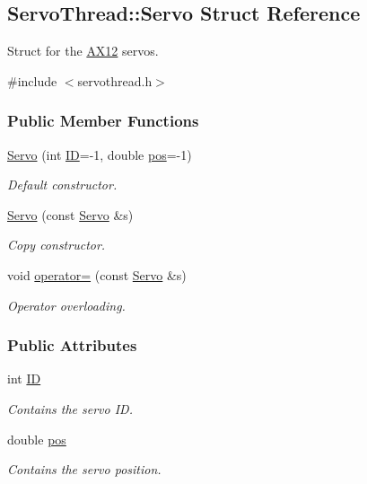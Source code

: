 \hypertarget{a00007}{}\subsection{Servo\+Thread\+:\+:Servo Struct Reference}
\label{a00007}


Struct for the \hyperlink{a00001}{A\+X12} servos.  




{\ttfamily \#include $<$servothread.\+h$>$}

\subsubsection*{Public Member Functions}
\begin{DoxyCompactItemize}
\item 
\hyperlink{a00007_a219887703cad3d3252fdde5a1aae586e}{Servo} (int \hyperlink{a00007_a06b514c42113aa85fd1703fc88fca7ce}{I\+D}=-\/1, double \hyperlink{a00007_a9fa0aa56944b9b0bb9d66303d5bd4b59}{pos}=-\/1)
\begin{DoxyCompactList}\small\item\em Default constructor. \end{DoxyCompactList}\item 
\hyperlink{a00007_acb657f09a5d04424d134791ca501cb54}{Servo} (const \hyperlink{a00007}{Servo} \&s)
\begin{DoxyCompactList}\small\item\em Copy constructor. \end{DoxyCompactList}\item 
void \hyperlink{a00007_acfe010f463ec6e85718a9883689811cb}{operator=} (const \hyperlink{a00007}{Servo} \&s)
\begin{DoxyCompactList}\small\item\em Operator overloading. \end{DoxyCompactList}\end{DoxyCompactItemize}
\subsubsection*{Public Attributes}
\begin{DoxyCompactItemize}
\item 
int \hyperlink{a00007_a06b514c42113aa85fd1703fc88fca7ce}{I\+D}
\begin{DoxyCompactList}\small\item\em Contains the servo I\+D. \end{DoxyCompactList}\item 
double \hyperlink{a00007_a9fa0aa56944b9b0bb9d66303d5bd4b59}{pos}
\begin{DoxyCompactList}\small\item\em Contains the servo position. \end{DoxyCompactList}\end{DoxyCompactItemize}


